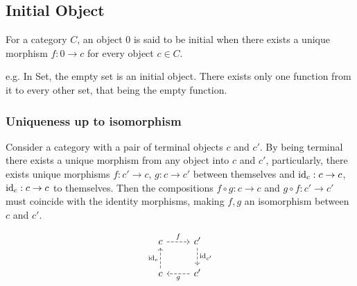 \subsection{Initial Object}

For a category $C$, an object $0$ is said to be initial when there exists a
unique morphism $f: 0\to c$ for every object $c\in C$.
\parencite{awodey:category_theory}

e.g. In Set, the empty set is an initial object. There exists only one function
from it to every other set, that being the empty function.

\subsubsection*{Uniqueness up to isomorphism}

Consider a category with a pair of terminal objects $c$ and $c'$. By being
terminal there exists a unique morphism from any object into $c$ and $c'$,
particularly, there exists unique morphisms $f: c' \to c$, $g: c \to c'$ between
themselves and $\mathrm{id}_c: c\to c$, $\mathrm{id}_c: c\to c$ to themselves.
Then the compositions $f\circ g:c\to c$ and $g\circ f:c' \to c'$ must coincide
with the identity morphisms, making $f,g$ an isomorphism between $c$ and $c'$.

\[\begin{tikzcd}
	c & {c'} \\
	c & {c'}
	\arrow["{\id_c}", dashed, from=2-1, to=1-1]
	\arrow["f", dashed, from=1-1, to=1-2]
	\arrow["{\id_{c'}}", dashed, from=1-2, to=2-2]
	\arrow["g", dashed, from=2-2, to=2-1]
\end{tikzcd}\]